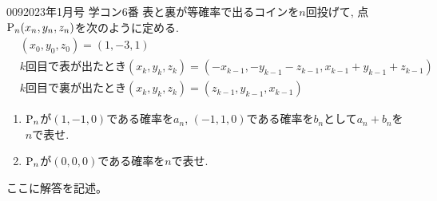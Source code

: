 \begin{prob}{009}{}{2023年1月号 学コン6番}
 表と裏が等確率で出るコインを$n$回投げて, 点${\rm P}_n(x_n,y_n,z_n)$を次のように定める.
 \begin{align*}
 &(x_0,y_0,z_0) = (1,-3,1) \\
 &\text{$k$回目で表が出たとき}(x_k,y_k,z_k) = (-x_{k-1}, -y_{k-1} - z_{k-1} , x_{k-1}+y_{k-1} + z_{k-1}) \\
 &\text{$k$回目で裏が出たとき}(x_k,y_k,z_k) = (z_{k-1}, y_{k-1}, x_{k-1})
 \end{align*}
 \begin{enumerate}
  \item ${\rm P}_n$が$(1,-1,0)$である確率を$a_n$, $(-1,1,0)$である確率を$b_n$として$a_n+b_n$を$n$で表せ.
  \item ${\rm P}_n$が$(0,0,0)$である確率を$n$で表せ.
 \end{enumerate}
\end{prob}

ここに解答を記述。
